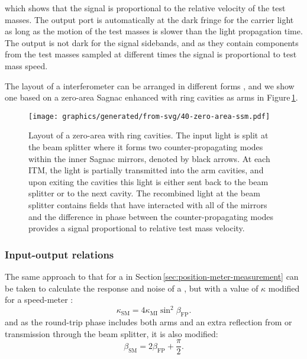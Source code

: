which shows that the signal is proportional to the relative velocity of the test masses. The output port is automatically at the dark fringe for the carrier light as long as the motion of the test masses is slower than the light propagation time. The output is not dark for the signal sidebands, and as they contain components from the test masses sampled at different times the signal is proportional to test mass speed.

The layout of a \SSM{} interferometer can be arranged in different forms \cite{Huttner2016}, and we show one based on a zero-area Sagnac enhanced with ring cavities as arms in Figure\,\ref{fig:zero-area-ssm}.

\begin{figure}
  \centering
  \texttt{[image: graphics/generated/from-svg/40-zero-area-ssm.pdf]}
  \caption[Layout of a zero-area \SSM{}]{\label{fig:zero-area-ssm}Layout of a zero-area \SSM{} with ring cavities. The input light is split at the beam splitter where it forms two counter-propagating modes within the inner Sagnac mirrors, denoted by black arrows. At each \gls{ITM}, the light is partially transmitted into the arm cavities, and upon exiting the cavities this light is either sent back to the beam splitter or to the next cavity. The recombined light at the beam splitter contains fields that have interacted with all of the mirrors and the difference in phase between the counter-propagating modes provides a signal proportional to relative test mass velocity.}
\end{figure} 

\subsubsection{Input-output relations}
The same approach to that for a \FPMI{} in Section\,\ref{sec:position-meter-measurement} can be taken to calculate the response and noise of a \SM{}, but with a value of $\kappa$ modified for a speed-meter \cite{Chen2003}:
\begin{equation}
  \kappa_{\text{SM}} = 4 \kappa_{\text{MI}} \sin^2 \beta_{\text{FP}}.
\end{equation}
and as the round-trip phase includes both arms and an extra reflection from or transmission through the beam splitter, it is also modified:
\begin{equation}
  \beta_{\text{SM}} = 2 \beta_{\text{FP}} + \frac{\pi}{2}.
\end{equation}

